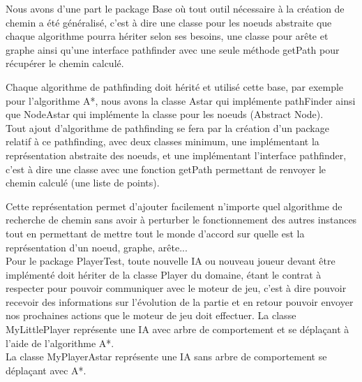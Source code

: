 Nous avons d'une part le package Base où tout outil nécessaire à la création de chemin a été généralisé, c'est à dire une classe pour les noeuds abstraite que chaque algorithme pourra hériter selon ses besoins, une classe pour arête et graphe ainsi qu'une interface pathfinder avec une seule méthode getPath pour récupérer le chemin calculé.

Chaque algorithme de pathfinding doit hérité et utilisé cette base, par exemple pour l'algorithme A*, nous avons la classe Astar qui implémente pathFinder ainsi que NodeAstar qui implémente la classe pour les noeuds (Abstract Node).
\\
Tout ajout d'algorithme de pathfinding se fera par la création d'un package relatif à ce pathfinding, avec deux classes minimum, une implémentant la représentation abstraite des noeuds, et une implémentant l'interface pathfinder, c'est à dire une classe avec une fonction getPath permettant de renvoyer le chemin calculé (une liste de points).

Cette représentation permet d'ajouter facilement n'importe quel algorithme de recherche de chemin sans avoir à perturber le fonctionnement des autres instances tout en permettant de mettre tout le monde d'accord sur quelle est la représentation d'un noeud, graphe, arête...
\\

Pour le package PlayerTest, toute nouvelle IA ou nouveau joueur devant être implémenté doit hériter de la classe Player du domaine, étant le contrat à respecter pour pouvoir communiquer avec le moteur de jeu, c'est à dire pouvoir recevoir des informations sur l'évolution de la partie et en retour pouvoir envoyer nos prochaines actions que le moteur de jeu doit effectuer.
La classe MyLittlePlayer représente une IA avec arbre de comportement et se déplaçant à l'aide de l'algorithme A*.\\
La classe MyPlayerAstar représente une IA sans arbre de comportement se déplaçant avec A*.